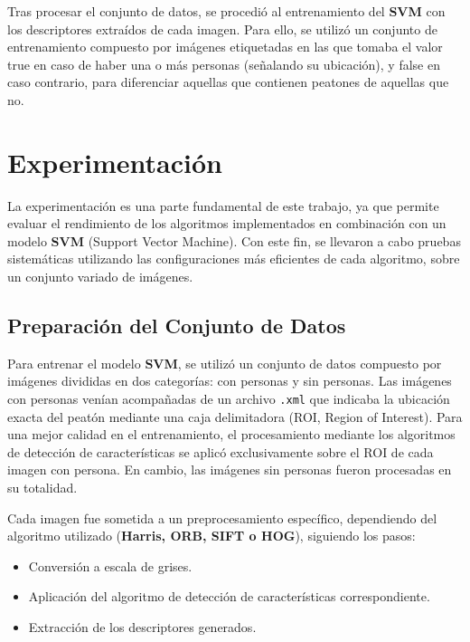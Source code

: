 \documentclass[a4paper]{article}
\begin{document}
Tras procesar el conjunto de datos, se procedió al entrenamiento del \textbf{SVM} con los descriptores extraídos de cada imagen. Para ello, se utilizó un conjunto de entrenamiento compuesto por imágenes etiquetadas en las que tomaba 
el valor true en caso de haber una o más personas (señalando su ubicación), y false en caso contrario, para diferenciar aquellas que contienen peatones de aquellas que no.


\section{Experimentación}

La experimentación es una parte fundamental de este trabajo, ya que permite evaluar el rendimiento de los algoritmos implementados en combinación con un modelo \textbf{SVM} (Support Vector Machine). 
Con este fin, se llevaron a cabo pruebas sistemáticas utilizando las configuraciones más eficientes de cada algoritmo, sobre un conjunto variado de imágenes.

\subsection{Preparación del Conjunto de Datos}

Para entrenar el modelo \textbf{SVM}, se utilizó un conjunto de datos compuesto por imágenes divididas en dos categorías: con personas y sin personas. Las imágenes con personas venían acompañadas de un archivo \texttt{.xml} que indicaba la ubicación exacta del peatón mediante una caja delimitadora (ROI, Region of Interest). Para una mejor calidad en el entrenamiento, el procesamiento mediante los algoritmos de detección de características se aplicó exclusivamente sobre el ROI de cada imagen con persona. En cambio, las imágenes sin personas fueron procesadas en su totalidad.

\par\vspace{0.5cm}
Cada imagen fue sometida a un preprocesamiento específico, dependiendo del algoritmo utilizado (\textbf{Harris, ORB, SIFT o HOG}), siguiendo los pasos:
\begin{itemize}
    \item Conversión a escala de grises.
    \item Aplicación del algoritmo de detección de características correspondiente.
    \item Extracción de los descriptores generados.
\end{itemize}
\end{document}
